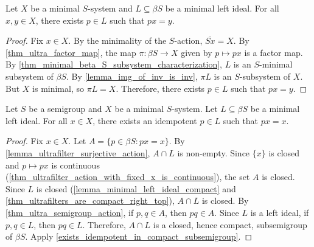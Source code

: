 \begin{lemma}
\label{lemma_ultrafilter_surjective_action}
\leanok{}
Let $X$ be a minimal $S$-system and $L \subseteq \beta S$ be a minimal left ideal.  For all $x, y \in X$, there exists $p \in L$ such that $px = y$.
\end{lemma}

\begin{proof}
\leanok{}
    Fix $x \in X$. By the minimality of the $S$-action, $\overline{Sx} = X$.  By \cref{thm_ultra_factor_map}, the map $\pi: \beta S \to X$ given by $p \mapsto px$ is a factor map.  By \cref{thm_minimal_beta_S_subsystem_characterization}, $L$ is an $S$-minimal subsystem of $\beta S$.  By \cref{lemma_img_of_inv_is_inv}, $\pi L$ is an $S$-subsystem of $X$.  But $X$ is minimal, so $\pi L = X$.  Therefore, there exists $p \in L$ such that $px = y$.
\end{proof}

\begin{lemma}
\label{lemma_exists_idempotent_px_is_x}
\leanok{}
Let $S$ be a semigroup and $X$ be a minimal $S$-system.  Let $L \subseteq \beta S$ be a minimal left ideal.  For all $x \in X$, there exists an idempotent $p \in L$ such that $px = x$.
\end{lemma}

\begin{proof}
\leanok{}
    Fix $x \in X$. Let $A = \{p \in \beta S : px = x\}$.  By \cref{lemma_ultrafilter_surjective_action}, $A \cap L$ is non-empty. Since $\{x\}$ is closed and $p \mapsto px$ is continuous (\cref{thm_ultrafilter_action_with_fixed_x_is_continuous}), the set $A$ is closed.  Since $L$ is closed (\cref{lemma_minimal_left_ideal_compact} and \cref{thm_ultrafilters_are_compact_right_top}), $A \cap L$ is closed. By \cref{thm_ultra_semigroup_action}, if $p, q \in A$, then $pq \in A$.  Since $L$ is a left ideal, if $p, q \in L$, then $pq \in L$.  Therefore, $A \cap L$ is a closed, hence compact, subsemigroup of $\beta S$. Apply \cref{exists_idempotent_in_compact_subsemigroup}.
\end{proof}

